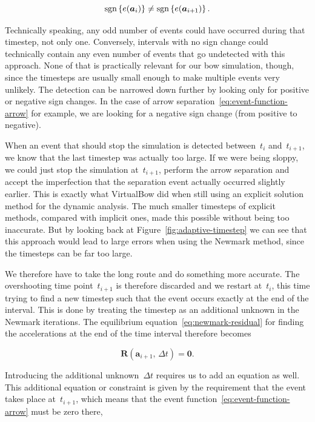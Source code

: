 \begin{equation}
\operatorname*{sgn}\left\{ e(\boldsymbol{a}_{i}) \right\} \neq \operatorname*{sgn}\left\{ e(\boldsymbol{a}_{i+1}) \right\}.
\end{equation}

Technically speaking, any odd number of events could have occurred during that timestep, not only one.
Conversely, intervals with no sign change could technically contain any even number of events that go undetected with this approach.
None of that is practically relevant for our bow simulation, though, since the timesteps are usually small enough to make multiple events very unlikely.
The detection can be narrowed down further by looking only for positive or negative sign changes.
In the case of arrow separation~\eqref{eq:event-function-arrow} for example, we are looking for a negative sign change (from positive to negative).

When an event that should stop the simulation is detected between~$t_{i}$ and~$t_{i+1}$, we know that the last timestep was actually too large.
If we were being sloppy, we could just stop the simulation at~$t_{i+1}$, perform the arrow separation and accept the imperfection that the separation event actually occurred slightly earlier.
This is exactly what VirtualBow did when still using an explicit solution method for the dynamic analysis.
The much smaller timesteps of explicit methods, compared with implicit ones, made this possible without being too inaccurate.
But by looking back at Figure~\ref{fig:adaptive-timestep} we can see that this approach would lead to large errors when using the Newmark method, since the timesteps can be far too large.

We therefore have to take the long route and do something more accurate.
The overshooting time point~$t_{i+1}$ is therefore discarded and we restart at~$t_{i}$, this time trying to find a new timestep such that the event occurs exactly at the end of the interval.
This is done by treating the timestep as an additional unknown in the Newmark iterations.
The equilibrium equation~\eqref{eq:newmark-residual} for finding the accelerations at the end of the time interval therefore becomes

\begin{equation}
\boldsymbol{R}(\boldsymbol{a}_{i+1},\,\Delta t) = \boldsymbol{0}. \label{eq:event-location-equation}
\end{equation}

Introducing the additional unknown~$\Delta t$ requires us to add an equation as well.
This additional equation or constraint is given by the requirement that the event takes place at~$t_{i+1}$, which means that the event function~\eqref{eq:event-function-arrow} must be zero there,

